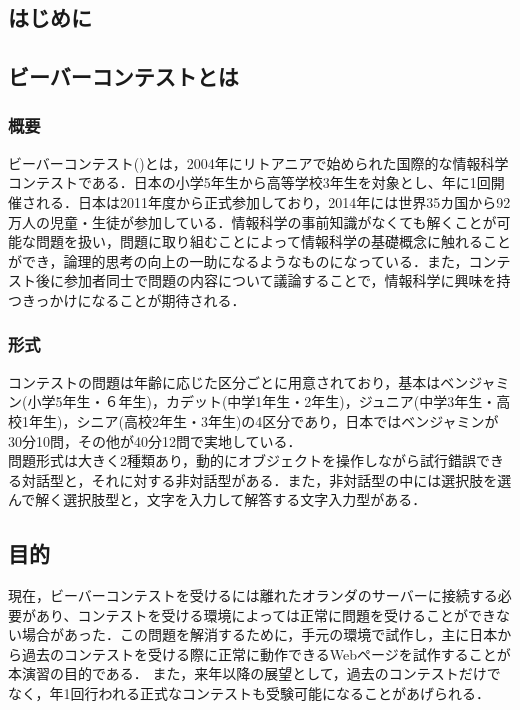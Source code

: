 \documentclass[a4paper]{jarticle}
\begin{document}
\maketitle
\begin{multicols}{2}
\setcounter{page}{1}

\section{はじめに}

\subsection{ビーバーコンテストとは}
\subsubsection{概要}
ビーバーコンテスト(\cite{bebras-contest, bebras-pdf})とは，2004年にリトアニアで始められた国際的な情報科学コンテストである．日本の小学5年生から高等学校3年生を対象とし、年に1回開催される．日本は2011年度から正式参加しており，2014年には世界35カ国から92万人の児童・生徒が参加している．情報科学の事前知識がなくても解くことが可能な問題を扱い，問題に取り組むことによって情報科学の基礎概念に触れることができ，論理的思考の向上の一助になるようなものになっている．また，コンテスト後に参加者同士で問題の内容について議論することで，情報科学に興味を持つきっかけになることが期待される．

\subsubsection{形式}
 コンテストの問題は年齢に応じた区分ごとに用意されており，基本はベンジャミン(小学5年生・６年生)，カデット(中学1年生・2年生)，ジュニア(中学3年生・高校1年生)，シニア(高校2年生・3年生)の4区分であり，日本ではベンジャミンが30分10問，その他が40分12問で実地している．
\\問題形式は大きく2種類あり，動的にオブジェクトを操作しながら試行錯誤できる対話型と，それに対する非対話型がある．また，非対話型の中には選択肢を選んで解く選択肢型と，文字を入力して解答する文字入力型がある．

\subsection{目的}
現在，ビーバーコンテストを受けるには離れたオランダのサーバーに接続する必要があり、コンテストを受ける環境によっては正常に問題を受けることができない場合があった．この問題を解消するために，手元の環境で試作し，主に日本から過去のコンテストを受ける際に正常に動作できるWebページを試作することが本演習の目的である．
また，来年以降の展望として，過去のコンテストだけでなく，年1回行われる正式なコンテストも受験可能になることがあげられる．


\end{multicols}
\end{document}
